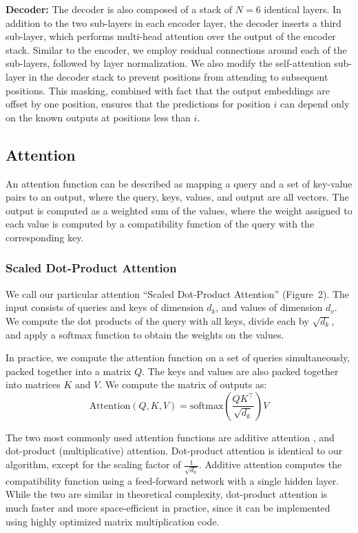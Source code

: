 \textbf{Decoder:} The decoder is also composed of a stack of $N = 6$ identical
layers. In addition to the two sub-layers in each encoder layer, the decoder
inserts a third sub-layer, which performs multi-head attention over the output
of the encoder stack. Similar to the encoder, we employ residual connections
around each of the sub-layers, followed by layer normalization. We also modify
the self-attention sub-layer in the decoder stack to prevent positions from
attending to subsequent positions. This masking, combined with fact that the
output embeddings are offset by one position, ensures that the predictions for
position $i$ can depend only on the known outputs at positions less than $i$.

\subsection{Attention}

An attention function can be described as mapping a query and a set of
key-value pairs to an output, where the query, keys, values, and output are
all vectors. The output is computed as a weighted sum of the values, where the
weight assigned to each value is computed by a compatibility function of the
query with the corresponding key.

\subsubsection{Scaled Dot-Product Attention}

We call our particular attention ``Scaled Dot-Product Attention'' (Figure~2).
The input consists of queries and keys of dimension $d_k$, and values of
dimension $d_v$. We compute the dot products of the query with all keys, divide
each by $\sqrt{d_k}$, and apply a softmax function to obtain the weights on
the values.

In practice, we compute the attention function on a set of queries
simultaneously, packed together into a matrix $Q$. The keys and values are also
packed together into matrices $K$ and $V$. We compute the matrix of outputs as:
\[
  \mathrm{Attention}(Q, K, V) = \mathrm{softmax}\!\left(\frac{QK^{\top}}{\sqrt{d_k}}\right)V
\]

The two most commonly used attention functions are additive attention
\cite{bahdanau2014neural}, and dot-product (multiplicative) attention.
Dot-product attention is identical to our algorithm, except for the scaling
factor of $\frac{1}{\sqrt{d_k}}$. Additive attention computes the compatibility
function using a feed-forward network with a single hidden layer. While the two
are similar in theoretical complexity, dot-product attention is much faster and
more space-efficient in practice, since it can be implemented using highly
optimized matrix multiplication code.

